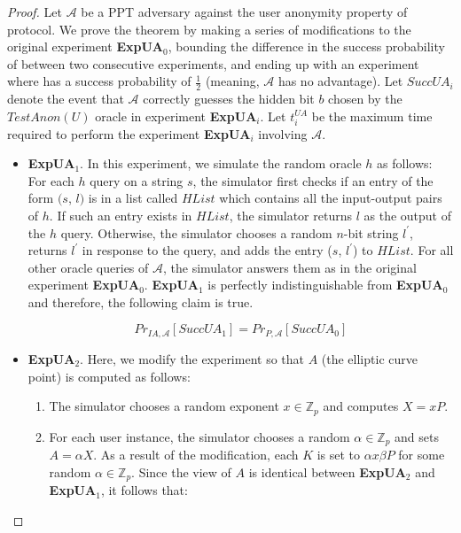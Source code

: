 \documentclass[a4paper,12pt]{report}
\begin{document}
\begin{proof}
Let $\mathcal{A}$ be a PPT adversary against the user anonymity
property of protocol. We prove the theorem by making a series of
modifications to the original experiment \textbf{ExpUA$_0$},
bounding the difference in the success probability of 
between two consecutive experiments, and ending up with an
experiment where  has a success probability of
$\frac{1}{2}$ (meaning, $\mathcal{A}$ has no advantage). Let
$SuccUA_i$ denote the event that $\mathcal{A}$ correctly guesses the
hidden bit $b$ chosen by the $TestAnon(U)$ oracle in experiment
\textbf{ExpUA$_i$}. Let $t_i^{UA}$ be the maximum time required to
perform the experiment \textbf{ExpUA$_i$} involving $\mathcal{A}$.

\begin{itemize}
\item \textbf{ExpUA$_1$}. In this experiment, we simulate
the random oracle $h$ as follows: For each $h$ query on a string
$s$, the simulator first checks if an entry of the form $(s$, $l)$
is in a list called $HList$ which contains all the input-output
pairs of $h$. If such an entry exists in $HList$, the simulator
returns $l$ as the output of the $h$ query. Otherwise, the simulator
chooses a random $n$-bit string $l^{\prime}$, returns $l^{\prime}$
in response to the query, and adds the entry ($s$, $l^{\prime}$) to
$HList$. For all other oracle queries of $\mathcal{A}$, the
simulator answers them as in the original experiment
\textbf{ExpUA$_0$}. \textbf{ExpUA$_1$} is perfectly
indistinguishable from \textbf{ExpUA$_0$} and therefore, the
following claim is true.

\begin{equation}\label{E1}
Pr_{IA, \mathcal{A}}[SuccUA_1] = Pr_{P, \mathcal{A}}[SuccUA_0]
\end{equation}

\item \textbf{ExpUA$_2$}. Here, we modify the experiment so
that $A$ (the elliptic curve point) is computed as follows:

\begin{enumerate}
\item The simulator chooses a random exponent $x \in \mathbb{Z}_p$ and computes $X = xP$.

\item For each user instance, the simulator chooses a random $\alpha \in \mathbb{Z}_p$ and sets $A = \alpha X$.
As a result of the modification, each $K$ is set to $\alpha x \beta
P$ for some random $\alpha \in \mathbb{Z}_p$. Since the view of $A$
is identical between \textbf{ExpUA$_2$} and \textbf{ExpUA$_1$}, it
follows that:
\end{enumerate}


\end{itemize}
\end{proof}
\end{document}
